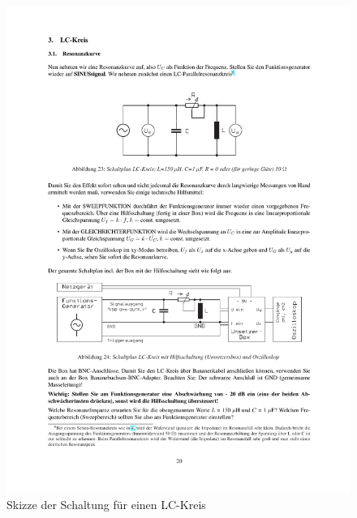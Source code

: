 \documentclass[12pt]{scrartcl}
\begin{document}
\begin{figure}[htbp] 
  \centering
    \includegraphics[trim = 20mm 200mm 1mm 50mm, clip, scale = 1]{LC_kreis.pdf}
  	\caption[Skizze der Schaltung für einen LC-Kreis]{Skizze der Schaltung für einen LC-Kreis\footnotemark}
  \label{fig:LC-Kreis}
\end{figure}
\newpage
{}
\end{document}
